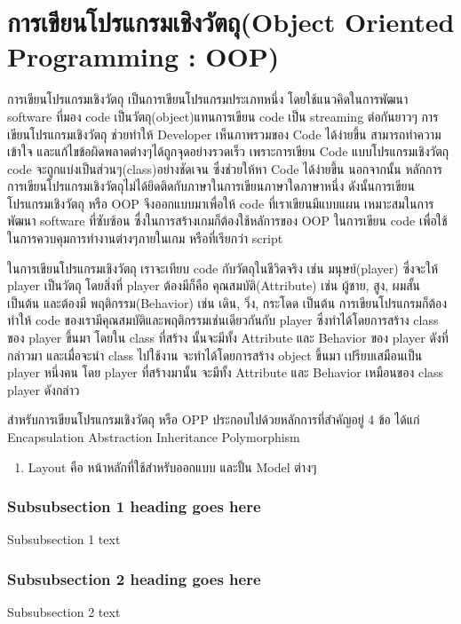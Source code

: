 \section{การเขียนโปรแกรมเชิงวัตถุ(Object Oriented Programming : OOP)}
\enskip \enskip \enskip \enskip \enskip การเขียนโปรแกรมเชิงวัตถุ เป็นการเขียนโปรแกรมประเภทหนึ่ง โดยใช้แนวคิดในการพัฒนา software 
ที่มอง code เป็นวัตถุ(object)แทนการเขียน code เป็น streaming ต่อกันยาวๆ การเขียนโปรแกรมเชิงวัตถุ
ช่วยทำให้ Developer เห็นภาพรวมของ Code ได้ง่ายขึ้น สามารถทำความเข้าใจ และแก้ไขข้อผิดพลาดต่างๆได้ถูกจุดอย่างรวดเร็ว 
เพราะการเขียน Code แบบโปรแกรมเชิงวัตถุ code จะถูกแบ่งเป็นส่วนๆ(class)อย่างชัดเจน ซึ่งช่วยให้หา Code ได้ง่ายขึ้น  
นอกจากนั้น หลักการการเขียนโปรแกรมเชิงวัตถุไม่ได้ยึดติดกับภาษาในการเขียนภาษาใดภาษาหนึ่ง ดังนั้นการเขียนโปรแกรมเชิงวัตถุ หรือ OOP จึงออกแบบมาเพื่อให้ code
ที่เราเขียนมีแบบแผน เหมาะสมในการพัฒนา software ที่ซับซ้อน ซื่งในการสร้างเกมก็ต้องใช้หลัการของ OOP ในการเขียน code เพื่อใช้ในการควบคุมการทำงานต่างๆภายในเกม 
หรือที่เรียกว่า script

\enskip \enskip \enskip \enskip \enskip ในการเขียนโปรแกรมเชิงวัตถุ เราจะเทียบ code กับวัตถุในชีวิตจริง เช่น มนุษย์(player) ซึ่งจะให้ player เป็นวัตถุ 
โดยสิ่งที่ player ต้องมีก็คือ คุณสมบัติ(Attribute) เช่น ผู้ชาย, สูง, ผมสั้น เป็นต้น และต้องมี พฤติกรรม(Behavior) เช่น เดิน, วิ่ง, กระโดด เป็นต้น 
การเขียนโปรแกรมก็ต้องทำให้ code ของเรามีคุณสมบัติและพฤติกรรมเช่นเดียวกันกับ player ซึ่งทำได้โดยการสร้าง class ของ player ขึ้นมา โดยใน class ที่สร้าง
นั้นจะมีทั้ง Attribute และ Behavior ของ player ดังที่กล่าวมา และเมื่อจะนำ class ไปใช้งาน จะทำได้โดยการสร้าง object ขึ้นมา เปรียบเสมือนเป็น player หนึ่งคน
โดย player ที่สร้างมานั้น จะมีทั้ง Attribute และ Behavior เหมือนของ class player ดังกล่าว


\enskip \enskip \enskip \enskip \enskip สำหรับการเขียนโปรแกรมเชิงวัตถุ หรือ OPP ประกอบไปด้วยหลักการที่สำคัญอยู่ 4 ข้อ ได้แก่ 
Encapsulation Abstraction Inheritance Polymorphism
\begin{enumerate}
\item Layout คือ หน้าหลักที่ใช้สำหรับออกแบบ และปั้น Model ต่างๆ
\end{enumerate}
\subsubsection{Subsubsection 1 heading goes here}
Subsubsection 1 text

\subsubsection{Subsubsection 2 heading goes here}
Subsubsection 2 text

